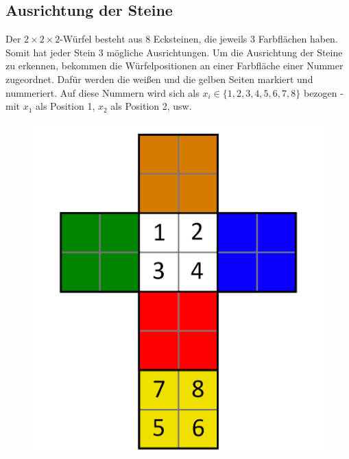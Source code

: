 \documentclass[12pt,a4paper, usenames, dvipsnames]{article}
\theoremstyle{mystyle}
\theoremstyle{definition}
\begin{document}
\subsection*{Ausrichtung der Steine} 
Der $2\times 2\times 2$-Würfel besteht aus 8 Ecksteinen, die jeweils 3 Farbflächen haben. Somit hat jeder Stein 3 mögliche Ausrichtungen. 
Um die Ausrichtung der Steine zu erkennen, bekommen die Würfelpositionen an einer Farbfläche einer Nummer zugeordnet. Dafür werden die weißen und die gelben Seiten markiert und nummeriert. Auf diese Nummern wird sich als $x_i \in \lbrace 1, 2, 3, 4, 5, 6, 7, 8 \rbrace$ bezogen - mit $x_1$ als Position 1, $x_2$ als Position 2, usw.
\begin{figure}[h]
\centering
\includegraphics[scale=0.1]{foldedout_numbers.png}

\end{figure}
\end{document}
